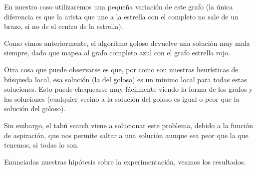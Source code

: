 
En nuestro caso utilizaremos una pequeña variación de este grafo (la única diferencia es que la arista que une a la estrella con el completo no sale de un brazo, si no de el centro de la estrella).

Como vimos anteriormente, el algoritmo goloso devuelve una solución muy mala siempre, dado que mapea al grafo completo azul con el grafo estrella rojo. 

Otra cosa que puede observarse es que, por como son nuestras heurísticas de búsqueda local, esa solución (la del goloso) es un mínimo local para todas estas soluciones. Esto puede chequearse muy fácilmente viendo la forma de los grafos y las soluciones (cualquier vecino a la solución del goloso es igual o peor que la solución del goloso).

Sin embargo, el tabú search viene a solucionar este problema, debido a la función de aspiración, que nos permite saltar a una solución aunque sea peor que la que tenemos, si todas lo son.

Enunciadas nuestras hipótesis sobre la experimentación, veamos los resultados.

